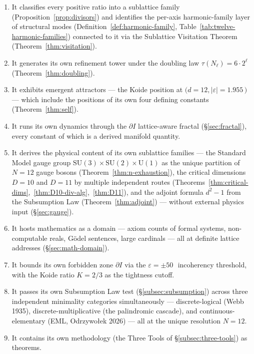 \documentclass[11pt,a4paper]{article}
\theoremstyle{definition}
\theoremstyle{remark}
\begin{document}
\begin{enumerate}[leftmargin=*]
\item It classifies every positive ratio into a sublattice family (Proposition~\ref{prop:divisors}) and identifies the per-axis harmonic-family layer of structural modes (Definition~\ref{def:harmonic-family}, Table~\ref{tab:twelve-harmonic-families}) connected to it via the Sublattice Visitation Theorem (Theorem~\ref{thm:visitation}).
\item It generates its own refinement tower under the doubling law $\tau(N_{\ell}) = 6\cdot 2^{\ell}$ (Theorem~\ref{thm:doubling}).
\item It exhibits emergent attractors --- the Koide position at $(d=12, |\varepsilon|=1.955$\,\textcent $)$ --- which include the positions of its own four defining constants (Theorem~\ref{thm:self}).
\item It runs its own dynamics through the $\partial I$ lattice-aware fractal (\S\ref{sec:fractal}), every constant of which is a derived manifold quantity.
\item It derives the physical content of its own sublattice families --- the Standard Model gauge group $\mathrm{SU}(3)\times\mathrm{SU}(2)\times\mathrm{U}(1)$ as the unique partition of $N = 12$ gauge bosons (Theorem~\ref{thm:n-exhaustion}), the critical dimensions $D = 10$ and $D = 11$ by multiple independent routes (Theorems~\ref{thm:critical-dims},~\ref{thm:D10-div-alg},~\ref{thm:D11}), and the adjoint formula $d^{2}-1$ from the Subsumption Law (Theorem~\ref{thm:adjoint}) --- without external physics input (\S\ref{sec:gauge}).
\item It hosts mathematics as a domain --- axiom counts of formal systems, non-computable reals, G\"odel sentences, large cardinals --- all at definite lattice addresses (\S\ref{sec:math-domain}).
\item It bounds its own forbidden zone $\partial I$ via the $\varepsilon=\pm 50$\,\textcent\ incoherency threshold, with the Koide ratio $K=2/3$ as the tightness cutoff.
\item It passes its own Subsumption Law test (\S\ref{subsec:subsumption}) across three independent minimality categories simultaneously --- discrete-logical (Webb 1935), discrete-multiplicative (the palindromic cascade), and continuous-elementary (EML, Odrzywo{\l}ek 2026) --- all at the unique resolution $N=12$.
\item It contains its own methodology (the Three Tools of \S\ref{subsec:three-tools}) as theorems.
\end{enumerate}
\end{document}
